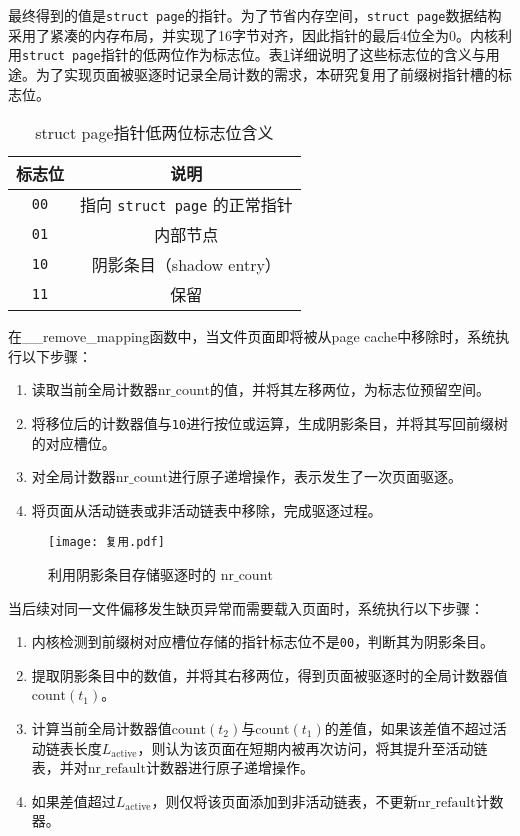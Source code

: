 最终得到的值是\texttt{struct page}的指针。为了节省内存空间，\texttt{struct page}数据结构采用了紧凑的内存布局，并实现了16字节对齐，因此指针的最后4位全为0。内核利用\texttt{struct page}指针的低两位作为标志位。表\ref{tab:标志位}详细说明了这些标志位的含义与用途。为了实现页面被驱逐时记录全局计数的需求，本研究复用了前缀树指针槽的标志位。

\begin{table}[htbp]
  \centering
  \caption{struct page指针低两位标志位含义}
  \label{tab:标志位}
  \begin{tabular}{cc}
    \toprule
    \textbf{标志位} & \textbf{说明} \\
    \midrule
    \texttt{00} & 指向 \texttt{struct page} 的正常指针 \\
    \texttt{01} & 内部节点 \\
    \texttt{10} & 阴影条目（shadow entry） \\
    \texttt{11} & 保留 \\
    \bottomrule
  \end{tabular}
\end{table}

在\_\_remove\_mapping函数中，当文件页面即将被从page cache中移除时，系统执行以下步骤：

\begin{enumerate}
  \item 读取当前全局计数器\(\mathrm{nr\_count}\)的值，并将其左移两位，为标志位预留空间。
  \item 将移位后的计数器值与\texttt{10}进行按位或运算，生成阴影条目，并将其写回前缀树的对应槽位。
  \item 对全局计数器\(\mathrm{nr\_count}\)进行原子递增操作，表示发生了一次页面驱逐。
  \item 将页面从活动链表或非活动链表中移除，完成驱逐过程。
\end{enumerate}

\begin{figure}[htbp]
  \centering
  \texttt{[image: 复用.pdf]}
  \caption{利用阴影条目存储驱逐时的 \(\mathrm{nr\_count}\)}
  \label{fig:复用}
\end{figure}
当后续对同一文件偏移发生缺页异常而需要载入页面时，系统执行以下步骤：

\begin{enumerate}
  \item 内核检测到前缀树对应槽位存储的指针标志位不是\texttt{00}，判断其为阴影条目。
  \item 提取阴影条目中的数值，并将其右移两位，得到页面被驱逐时的全局计数器值\(\mathrm{count}(t_1)\)。
  \item 计算当前全局计数器值\(\mathrm{count}(t_2)\)与\(\mathrm{count}(t_1)\)的差值，如果该差值不超过活动链表长度\(L_{\mathrm{active}}\)，则认为该页面在短期内被再次访问，将其提升至活动链表，并对\(\mathrm{nr\_refault}\)计数器进行原子递增操作。
  \item 如果差值超过\(L_{\mathrm{active}}\)，则仅将该页面添加到非活动链表，不更新\(\mathrm{nr\_refault}\)计数器。
\end{enumerate}

